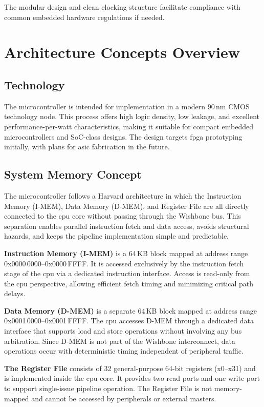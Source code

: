 \begin{itemize}
The modular design and clean clocking structure facilitate compliance with common embedded hardware regulations if needed.

\section{Architecture Concepts Overview} 

\subsection{Technology}
The microcontroller is intended for implementation in a modern 90\,nm CMOS technology node. 
This process offers high logic density, low leakage, and excellent performance-per-watt characteristics,
making it suitable for compact embedded microcontrollers and \gls{SoC}-class designs. The design targets \gls{fpga} prototyping initially, with plans for \gls{asic} fabrication in the future.

\subsection{System Memory Concept}
The microcontroller follows a \gls{Harvard} architecture in which the Instruction Memory (\gls{I-MEM}), 
Data Memory (\gls{D-MEM}), and Register File are all directly connected to the \gls{cpu} core without passing 
through the Wishbone bus. This separation enables parallel instruction fetch and data access, avoids 
structural hazards, and keeps the \gls{pipeline} implementation simple and predictable.

\textbf{Instruction Memory (\gls{I-MEM})} is a 64\,KB block mapped at address range 
0x0000\,0000–0x0000\,FFFF. It is accessed exclusively by the instruction fetch stage of the \gls{cpu} via 
a dedicated instruction interface. Access is read-only from the \gls{cpu} perspective, allowing efficient 
fetch timing and minimizing critical path delays.

\textbf{Data Memory (\gls{D-MEM})} is a separate 64\,KB block mapped at address range 
0x0001\,0000–0x0001\,FFFF. The \gls{cpu} accesses \gls{D-MEM} through a dedicated data interface that supports 
load and store operations without involving any bus arbitration. Since \gls{D-MEM} is not part of the 
Wishbone interconnect, data operations occur with deterministic timing independent of peripheral 
traffic.

\textbf{The Register File} consists of 32 general-purpose 64-bit registers (x0–x31) and is implemented 
inside the \gls{cpu} core. It provides two read ports and one write port to support single-issue \gls{pipeline} 
operation. The Register File is not memory-mapped and cannot be accessed by peripherals or external 
masters.


\end{itemize}
